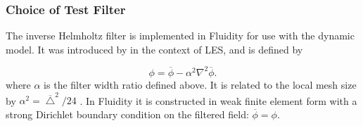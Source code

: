 \subsubsection{Choice of Test Filter}\label{lesfilter}

The inverse Helmholtz filter is implemented in Fluidity for use with the dynamic model. It was introduced by \citet{germano1986a} in the context of LES, and is defined by

\begin{equation}\label{invhelm}
\phi = \overline \phi - \alpha^2 \nabla^2 \overline \phi.
\end{equation}
where $\alpha$ is the filter width ratio defined above. It is related to the local mesh size by $\alpha^2 = \overline \bigtriangleup^2/24$ \citep{pope}. In Fluidity it is constructed in weak finite element form with a strong Dirichlet boundary condition on the filtered field: $\overline \phi = \phi$.


